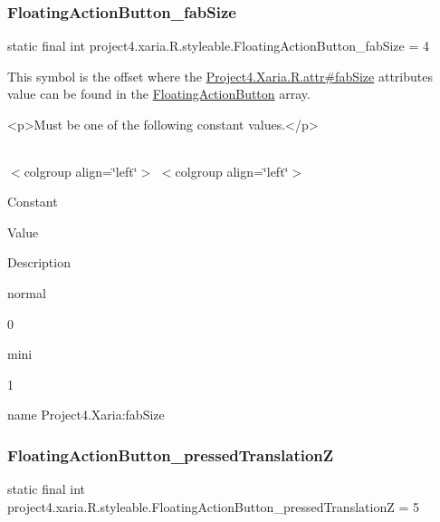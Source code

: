 \subsubsection{\texorpdfstring{Floating\+Action\+Button\+\_\+fab\+Size}{FloatingActionButton\_fabSize}}
{\footnotesize\ttfamily static final int project4.\+xaria.\+R.\+styleable.\+Floating\+Action\+Button\+\_\+fab\+Size = 4\hspace{0.3cm}{\ttfamily [static]}}

This symbol is the offset where the \hyperlink{}{Project4.\+Xaria.\+R.\+attr\#fab\+Size} attribute\textquotesingle{}s value can be found in the \hyperlink{classproject4_1_1xaria_1_1R_1_1styleable_afccbd80ac1ce5fd6f7a9ee0a1b546322}{Floating\+Action\+Button} array.

\begin{DoxyVerb}      <p>Must be one of the following constant values.</p>
\end{DoxyVerb}
 \tabulinesep=1mm
\begin{longtabu} spread 0pt [c]{*{0}{|X[-1]}|}
\hline
\end{longtabu}
$<$colgroup align=\char`\"{}left\char`\"{}$>$ $<$colgroup align=\char`\"{}left\char`\"{}$>$ 

Constant

Value

Description 

{\ttfamily normal}

0

{\ttfamily mini}

1

name Project4.\+Xaria\+:fab\+Size \mbox{\label{classproject4_1_1xaria_1_1R_1_1styleable_a0017ae9170f65572e5d8c6c4077e3a32}} 
\subsubsection{\texorpdfstring{Floating\+Action\+Button\+\_\+pressed\+TranslationZ}{FloatingActionButton\_pressedTranslationZ}}
{\footnotesize\ttfamily static final int project4.\+xaria.\+R.\+styleable.\+Floating\+Action\+Button\+\_\+pressed\+TranslationZ = 5\hspace{0.3cm}{\ttfamily [static]}}

